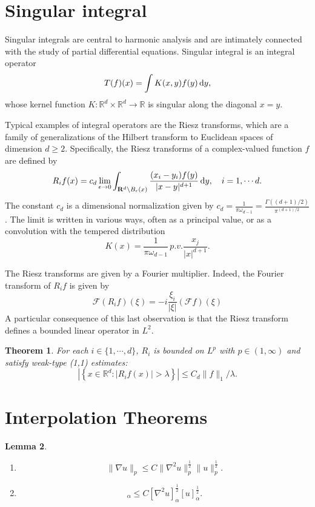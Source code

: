 \documentclass[twoside, 12pt]{book}
\numberwithin{equation}{chapter}
\newtheorem{theorem}{Theorem}[section]
\newtheorem{lemma}[theorem]{Lemma}
\def\mR{{\mathbb R}}
\def\l{\left}
\def\r{\right}
\def\geq{\geqslant}
\def\leq{\leqslant}
\def\d{\text{\rm{d}}}
\begin{document}
	\section{Singular integral}
	Singular integrals are central to harmonic analysis and are intimately connected with the study of partial differential equations. Singular integral is an integral operator
	\[
	    T(f)(x)=\int K(x,y)f(y)\,\d y,
	\]
	whose kernel function $K: \mR^d\times\mR^d\to \mR$ is singular along the diagonal $x=y$. 
	
	Typical examples of integral operators are the Riesz transforms, which are a family of generalizations of the Hilbert transform to Euclidean spaces of dimension $d\geq 2$. Specifically, the Riesz transforms of a complex-valued function $f$ are defined by 
	\[
	    R_{i}f(x)=c_{d}\lim _{\epsilon \to 0}\int _{\mathbf {R}^{d}\backslash B_{\epsilon }(x)}{\frac {(x_{i}-y_{i})f(y)}{|x-y|^{d+1}}}\,\d y, \quad i=1,\cdots d. 
	\]
	The constant $c_d$ is a dimensional normalization given by $c_d={\frac {1}{\pi \omega _{d-1}}}=\frac {\Gamma((d+1)/2)}{\pi ^{(d+1)/2}}$. 
	The limit is written in various ways, often as a principal value, or as a convolution with the tempered distribution
	\[
	    K(x)={\frac {1}{\pi \omega _{d-1}}}\,p.v.{\frac {x_{j}}{|x|^{d+1}}}.
	\]
	
	The Riesz transforms are given by a Fourier multiplier. Indeed, the Fourier transform of $R_i f$ is given by 
	\[
	    \mathcal{F} (R_{i}f)(\xi)=-i \frac{\xi_{i}}{|\xi|} (\mathcal{F} f)(\xi)
	\] 
	A particular consequence of this last observation is that the Riesz transform defines a bounded linear operator in $L^2$.
	
	\begin{theorem}
	For each $i\in \{1,\cdots, d\}$, $R_i$ is bounded on $L^p$ with $p\in (1,\infty)$ and satisfy weak-type (1,1) estimates: 
		\begin{equation}
			\l| \l\{x\in \mR^d:  |R_i f(x)|>\lambda \r\}\r|\leq C_d \|f\|_1/\lambda. 
		\end{equation}\end{theorem}
	
    \section{Interpolation Theorems} 
    
	\begin{lemma}\label{lem:Inter}
	    \begin{enumerate}
	        \item 
         \begin{equation}
             \|\nabla u\|_p\leq C \|\nabla^2 u\|_p^{\frac{1}{2}}\|u\|_p^{\frac{1}{2}}. 
         \end{equation}
            \item \begin{equation}
                [\nabla u]_\alpha\leq C [\nabla^2 u]_\alpha^{\frac{1}{2}} [u]_{\alpha}^{\frac{1}{2}}. 
            \end{equation}
	    \end{enumerate}
	\end{lemma}
	
\end{document}
